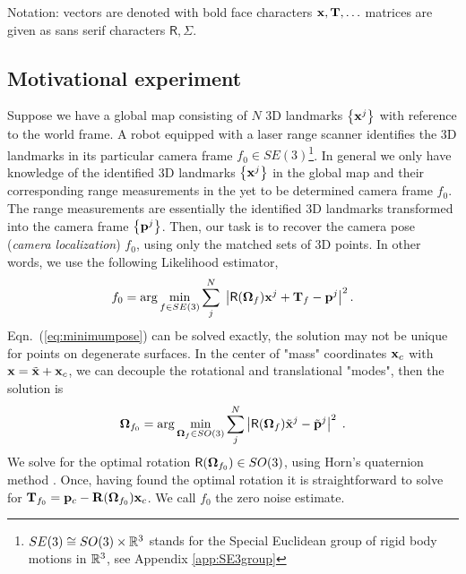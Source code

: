 \documentclass[conference]{IEEEtran}
\newcommand{\real}{\Bbb R}
\newcommand{\bfOmega}{\boldsymbol{\Omega}}
\newcommand{\beq}{\begin{equation}}
\newcommand{\eeq}{\end{equation}}
\begin{document}
Notation: vectors are denoted with bold face characters ${\bf x}, {\bf T}, \ldots$
matrices are given as sans serif characters $\mathsf{R}, \mathsf{\Sigma}$.

\subsection{Motivational experiment}
Suppose we have a global map consisting of $N$ 3D landmarks $\left\{ {\bf x}^j \right\}$ with reference to the world frame. A robot equipped with a laser range scanner identifies the 3D landmarks in its particular camera frame
$f_0\in SE(3)$\footnote{$SE(3) \cong SO(3)\times\real^3$ stands for the Special Euclidean group of rigid body motions in $\real^3$, see Appendix \ref{app:SE3group}}.
In general we only have knowledge of the identified 3D landmarks $\left\{ {\bf x}^j \right\}$ in the global map
and their corresponding range measurements in the yet to be determined camera frame $f_0$. The range
measurements are essentially the identified 3D landmarks transformed into the camera frame $\left\{ {\bf p}^j \right\}$. Then, our task is to recover the camera pose ({\em camera localization}) $f_0$, using only the
matched sets of 3D points. In other words, we use the following Likelihood estimator,
\beq
    f_0 = \arg\min_{f \in SE(3)} \sum_j^N \; \left| {\sf R}(\bfOmega_f) {\bf x}^j + {\bf T}_f - {\bf p}^j \right|^2.
   \label{eq:minimumpose}
\eeq
Eqn.~(\ref{eq:minimumpose}) can be solved exactly, the solution may not be unique for points on
degenerate surfaces. In the center of "mass" coordinates ${\bf x}_c$ with ${\bf x} = \tilde{\bf x}
+ {\bf x}_c$, we can decouple the rotational and translational "modes", then the solution is
\beq
    \bfOmega_{f_0} = \arg\min_{\bfOmega_f \in SO(3)} \sum_j^N \left| {\sf R}(\bfOmega_f)\tilde{\bf x}^{j} - \tilde{\bf p}^{j}
    \right|^2\; . \label{eq:bestrotation}
\eeq
We solve for the optimal rotation ${\sf R}(\bfOmega_{f_0})\in SO(3)$, using Horn's quaternion method
\cite{Horn87,Horn88}. Once, having found the optimal rotation it is straightforward to solve for
${\bf T}_{f_0} = {\bf p}_c - {\bf R}(\bfOmega_{f_0}){\bf x}_c$. We call $f_0$ the zero noise estimate.
\end{document}
